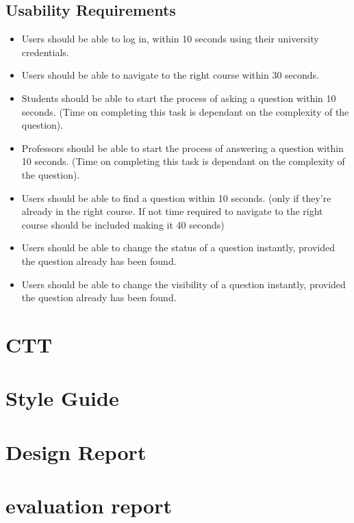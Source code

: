 \documentclass[10pt]{report}
\begin{document}
\subsection{Usability Requirements}
\begin{itemize}
	\item Users should be able to log in, within 10 seconds using their university credentials.
	\item Users should be able to navigate to the right course within 30 seconds.
	\item Students should be able to start the process of asking a question within 10 seconds. (Time on completing this task is dependant on the complexity of the question).
	\item Professors should be able to start the process of answering a question within 10 seconds. (Time on completing this task is dependant on the complexity of the question).
	\item Users should be able to find a question within 10 seconds. (only if they're already in the right course. If not time required to navigate to the right course should be included making it 40 seconds)
	\item Users should be able to change the status of a question instantly, provided the question already has been found.
	\item Users should be able to change the visibility of a question instantly, provided the question already has been found.
\end{itemize}

\section{CTT}

\section{Style Guide}

\section{Design Report}

\section{evaluation report}
\end{document}
